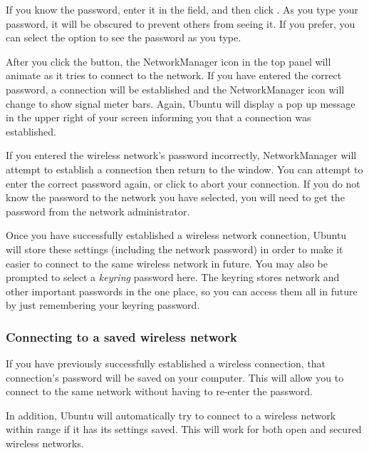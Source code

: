 
If you know the password, enter it in the  field, and then click . As you type your password, it will be obscured to prevent others from seeing it. If you prefer, you can select the  option to see the password as you type.

After you click the  button, the NetworkManager icon in the top
panel will animate as it tries to connect to the network. If you have entered the correct password, a connection will be established and the NetworkManager icon will change to show signal meter bars. Again, Ubuntu will display a pop up message in the upper right of your screen informing you that a connection was 
established.

If you entered the wireless network's password incorrectly, NetworkManager will attempt to establish a connection then return to the  window. You can attempt to enter the correct password again, or click  to 
abort your connection. If you do not know the password to the network you
have selected, you will need to get the password from the network
administrator.

Once you have successfully established a wireless network connection, Ubuntu will store these settings (including the network password) in order to make it easier to connect to the same wireless network in future. You may also be prompted to select a \emph{keyring} password here. The keyring stores network and other important passwords in the one place, so you can access them all in future by just remembering your keyring password.

\subsubsection{Connecting to a saved wireless network}

If you have previously successfully established a wireless connection,
that connection's password will be saved on your computer. This will 
allow you to connect to the same network without having to re-enter the
password.

In addition, Ubuntu will automatically try to connect to a wireless
network within range if it has its settings saved. This will work for
both open and secured wireless networks.

